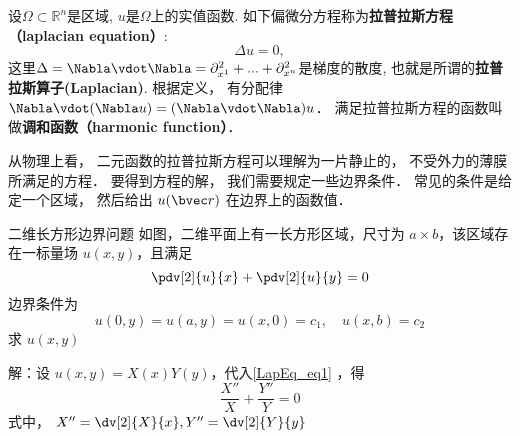 
\begin{issues}
\issueDraft
\end{issues}


设$\Omega\subset\mathbb{R}^n$是区域, $u$是$\Omega$上的实值函数. 如下偏微分方程称为\textbf{拉普拉斯方程（laplacian equation）}:
\begin{equation}
\Delta u = 0,
\end{equation}
这里$\Delta=\Nabla\vdot\Nabla=\partial_{x^1}^2+...+\partial_{x^n}^2$是梯度的散度, 也就是所谓的\textbf{拉普拉斯算子(Laplacian)}. 根据定义， 有分配律 $\Nabla \vdot (\Nabla u) = (\Nabla \vdot \Nabla) u$． 满足拉普拉斯方程的函数叫做\textbf{调和函数（harmonic function）}．

从物理上看， 二元函数的拉普拉斯方程可以理解为一片静止的， 不受外力的薄膜所满足的方程． 要得到方程的解， 我们需要规定一些边界条件． 常见的条件是给定一个区域， 然后给出 $u(\bvec r)$ 在边界上的函数值．

\begin{example}{二维长方形边界问题}
如图，二维平面上有一长方形区域，尺寸为 $a\times b$，该区域存在一标量场 $u(x,y)$，且满足
\begin{equation}\label{LapEq_eq1}
\pdv[2]{u}{x}+\pdv[2]{u}{y}=0
\end{equation}
边界条件为
\begin{equation}
u(0,y)=u(a,y)=u(x,0)=c_1,\quad u(x,b)=c_2
\end{equation}
求 $u(x,y)$
\end{example}

解：设 $u(x,y)=X(x)Y(y)$，代入\autoref{LapEq_eq1} ，得
\begin{equation}
\frac{X''}{X}+\frac{Y''}{Y}=0
\end{equation}
式中， $X''=\dv[2]{X}{x},Y''=\dv[2]{Y}{y}$